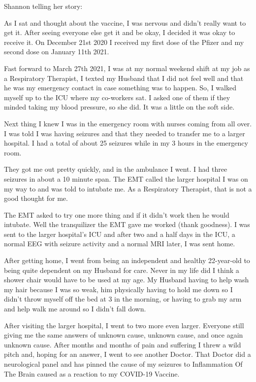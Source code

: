 Shannon telling her story:

As I sat and thought about the vaccine, I was nervous and didn’t really want to
get it. After seeing everyone else get it and be okay, I decided it was okay to
receive it. On December 21st 2020 I received my first dose of the Pfizer and my
second dose on January 11th 2021.

Fast forward to March 27th 2021, I was at my normal weekend shift at my job as a
Respiratory Therapist, I texted my Husband that I did not feel well and that he
was my emergency contact in case something was to happen. So, I walked myself up
to the ICU where my co-workers sat. I asked one of them if they minded taking my
blood pressure, so she did. It was a little on the soft side.

Next thing I knew I was in the emergency room with nurses coming from all
over. I was told I was having seizures and that they needed to transfer me to a
larger hospital. I had a total of about 25 seizures while in my 3 hours in the
emergency room.

They got me out pretty quickly, and in the ambulance I went. I had three
seizures in about a 10 minute span. The EMT called the larger hospital I was on
my way to and was told to intubate me. As a Respiratory Therapist, that is not a
good thought for me.

The EMT asked to try one more thing and if it didn’t work then he would
intubate. Well the tranquilizer the EMT gave me worked (thank goodness). I was
sent to the larger hospital’s ICU and after two and a half days in the ICU, a
normal EEG with seizure activity and a normal MRI later, I was sent home.

After getting home, I went from being an independent and healthy 22-year-old to
being quite dependent on my Husband for care. Never in my life did I think a
shower chair would have to be used at my age. My Husband having to help wash my
hair because I was so weak, him physically having to hold me down so I didn’t
throw myself off the bed at 3 in the morning, or having to grab my arm and help
walk me around so I didn’t fall down.

After visiting the larger hospital, I went to two more even larger. Everyone
still giving me the same answers of unknown cause, unknown cause, and once again
unknown cause. After months and months of pain and suffering I threw a wild
pitch and, hoping for an answer, I went to see another Doctor. That Doctor did a
neurological panel and has pinned the cause of my seizures to Inflammation Of
The Brain caused as a reaction to my COVID-19 Vaccine.

